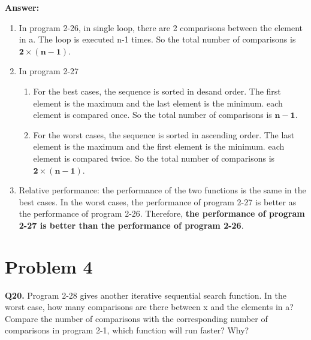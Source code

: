\documentclass{article}
\begin{document}
\textbf{Answer:}
\begin{enumerate}
    \item In program 2-26, in single loop, there are 2 comparisons between the element in a. The loop is executed n-1 times. So the total number of comparisons is $\mathbf{2\times (n-1)}$.
    \item In program 2-27
          \begin{enumerate}
              \item For the best cases, the sequence is sorted in desand order. The first element is the maximum and the last element is the minimum. each element is compared once. So the total number of comparisons is $\mathbf{n-1}$.
              \item For the worst cases, the sequence is sorted in ascending order. The last element is the maximum and the first element is the minimum. each element is compared twice. So the total number of comparisons is $\mathbf{2\times (n-1)}$.
          \end{enumerate}
    \item Relative performance: the performance of the two functions is the same in the best cases. In the worst cases, the performance of program 2-27 is better as the performance of program 2-26. Therefore, \textbf{the performance of program 2-27 is better than the performance of program 2-26}.
\end{enumerate}

\section{Problem 4}
\textbf{Q20.}
Program 2-28 gives another iterative sequential search function. In the worst case, how many comparisons are there between x and the elements in a? Compare the number of comparisons with the corresponding number of comparisons in program 2-1, which function will run faster? Why?
\end{document}
